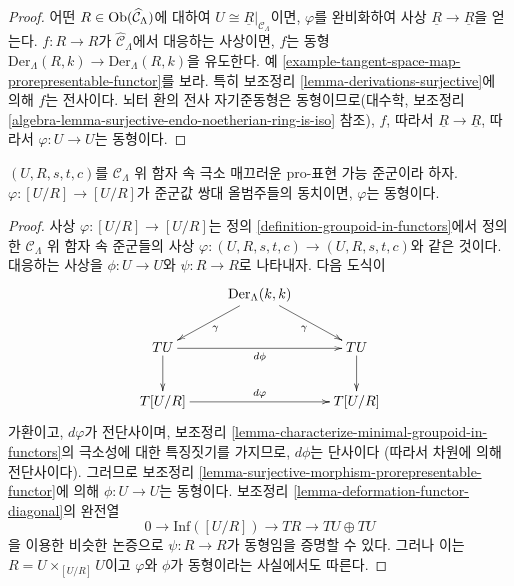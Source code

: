 \begin{proof}
어떤 $R \in \mathop{\mathrm{Ob}}\nolimits(\widehat{\mathcal{C}}_\Lambda)$에 대하여
$U \cong \underline{R}|_{\mathcal{C}_\Lambda}$이면,
$\varphi$를 완비화하여 사상 $\underline{R} \to \underline{R}$을 얻는다.
$f: R \to R$가 $\widehat{\mathcal{C}}_\Lambda$에서 대응하는 사상이면,
$f$는 동형
$\text{Der}_\Lambda(R, k) \to \text{Der}_\Lambda(R, k)$을 유도한다.
예 \ref{example-tangent-space-map-prorepresentable-functor}를 보라.
특히 보조정리 \ref{lemma-derivations-surjective}에 의해 $f$는 전사이다.
뇌터 환의 전사 자기준동형은 동형이므로(대수학, 보조정리
\ref{algebra-lemma-surjective-endo-noetherian-ring-is-iso} 참조),
$f$, 따라서 $\underline{R} \to \underline{R}$, 따라서
$\varphi : U \to U$는 동형이다.
\end{proof}

\begin{lemma}
\label{lemma-minimal-prorepresentable-groupoid-autoequivalence}
$(U, R, s, t, c)$를 $\mathcal{C}_\Lambda$ 위 함자 속
극소 매끄러운 pro-표현 가능 준군이라 하자.
$\varphi : [U/R] \to [U/R]$가 준군값 쌍대 올범주들의 동치이면,
$\varphi$는 동형이다.
\end{lemma}

\begin{proof}
사상 $\varphi : [U/R] \to [U/R]$는 정의
\ref{definition-groupoid-in-functors}에서 정의한
$\mathcal{C}_\Lambda$ 위 함자 속 준군들의 사상
$\varphi : (U, R, s, t, c) \to (U, R, s, t, c)$와 같은 것이다.
대응하는 사상을 $\phi : U \to U$와 $\psi : R \to R$로 나타내자.
다음 도식이
$$
\xymatrix{
& \text{Der}_\Lambda(k, k) \ar[dr]_\gamma \ar[dl]^\gamma \\
TU \ar[rr]_{d\phi} \ar[d] & & TU \ar[d]  \\
T[U/R] \ar[rr]^{d\varphi} & & T[U/R]
}
$$
가환이고, $d\varphi$가 전단사이며, 보조정리
\ref{lemma-characterize-minimal-groupoid-in-functors}의
극소성에 대한 특징짓기를 가지므로, $d\phi$는 단사이다
(따라서 차원에 의해 전단사이다). 그러므로 보조정리
\ref{lemma-surjective-morphism-prorepresentable-functor}에 의해
$\phi : U \to U$는 동형이다. 보조정리
\ref{lemma-deformation-functor-diagonal}의 완전열
$$
0 \to \text{Inf}([U/R]) \to TR \to TU \oplus TU
$$
을 이용한 비슷한 논증으로 $\psi : R \to R$가 동형임을 증명할 수 있다.
그러나 이는 $R = U \times_{[U/R]} U$이고 $\varphi$와 $\phi$가
동형이라는 사실에서도 따른다.
\end{proof}

